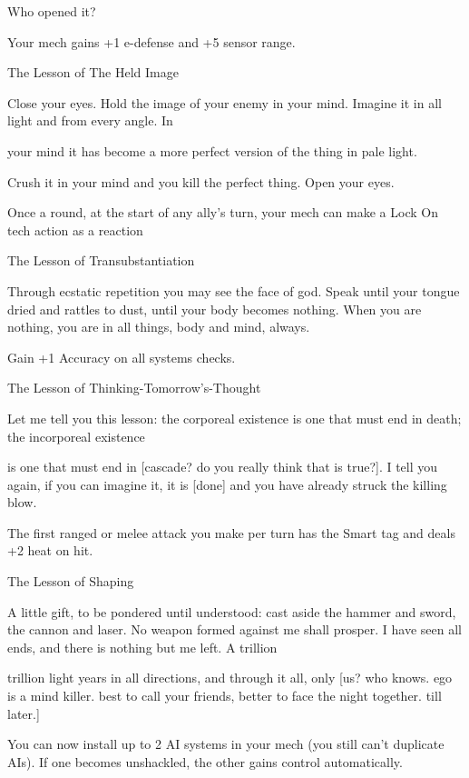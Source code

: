 Who opened it?   

Your mech gains +1 e-defense and +5 sensor range.
 

The Lesson of The Held Image  

Close your eyes. Hold the image of your enemy in your mind. Imagine it in all light and from every angle. In  

your mind it has become a more perfect version of the thing in pale light. 
 
Crush it in your mind and you kill the perfect thing. Open your eyes.    

Once a round, at the start of any ally’s turn, your mech can make a Lock On tech action as a  
reaction
 

The Lesson of Transubstantiation  

Through ecstatic repetition you may see the face of god. Speak until your tongue dried and rattles to dust,  
until your body becomes nothing. When you are nothing, you are in all things, body and mind, always.    

Gain +1 Accuracy on all systems checks.  

The Lesson of Thinking-Tomorrow’s-Thought  

Let me tell you this lesson: the corporeal existence is one that must end in death; the incorporeal existence  

is one that must end in [cascade? do you really think that is true?]. I tell you again, if you can imagine it, it is  
[done] and you have already struck the killing blow.   

The first ranged or melee attack you make per turn has the Smart tag and deals +2 heat on hit.
 

                                                                                                                  


The Lesson of Shaping   

A little gift, to be pondered until understood: cast aside the hammer and sword, the cannon and laser. No  
weapon formed against me shall prosper. I have seen all ends, and there is nothing but me left. A trillion  

trillion light years in all directions, and through it all, only [us? who knows. ego is a mind killer. best to call  
your friends, better to face the night together. till later.]
 

You can now install up to 2 AI systems in your mech (you still can’t duplicate AIs). If one  
becomes unshackled, the other gains control automatically.
 


